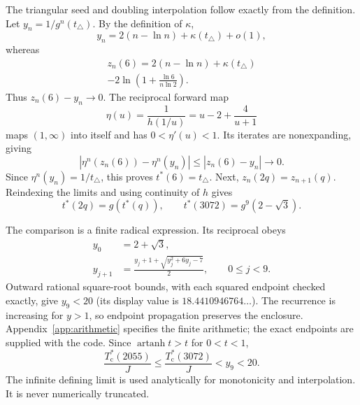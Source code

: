 \documentclass[aps,pre,reprint,amsmath,amssymb,nofootinbib,longbibliography,floatfix]{revtex4-2}
\newcommand{\Tc}{T_{\mathrm c}}
\newcommand{\atanh}{\operatorname{artanh}}
\begin{document}
The triangular seed and doubling interpolation follow exactly from the definition. Let \(y_n=1/g^n(t_\triangle)\). By the definition of \(\kappa\),
\begin{equation}
 y_n=2(n-\ln n)+\kappa(t_\triangle)+o(1),
\end{equation}
whereas
\begin{equation}
\begin{split}
 z_n(6)=2(n-\ln n)+\kappa(t_\triangle)\\
 -2\ln\!\left(1+\frac{\ln6}{n\ln2}\right).
\end{split}
\end{equation}
Thus \(z_n(6)-y_n\to0\). The reciprocal forward map
\begin{equation}
 \eta(u)=\frac1{h(1/u)}=u-2+\frac4{u+1}
\end{equation}
maps \((1,\infty)\) into itself and has \(0<\eta'(u)<1\). Its iterates are nonexpanding, giving
\begin{equation}
 \left|\eta^n(z_n(6))-\eta^n(y_n)\right|
 \leq |z_n(6)-y_n|\longrightarrow0.
\end{equation}
Since \(\eta^n(y_n)=1/t_\triangle\), this proves \(t^*(6)=t_\triangle\).
Next, \(z_n(2q)=z_{n+1}(q)\). Reindexing the limits and using continuity of \(h\) gives
\begin{equation}
 t^*(2q)=g(t^*(q)),\qquad
 t^*(3072)=g^9(2-\sqrt3).
 \label{eq:interpolation}
\end{equation}

The comparison is a finite radical expression. Its reciprocal obeys
\begin{equation}
\begin{aligned}
 y_0&=2+\sqrt3,\\
 y_{j+1}&=\frac{y_j+1+\sqrt{y_j^2+6y_j-7}}2,
 \qquad 0\leq j<9.
\end{aligned}
\label{eq:radicals}
\end{equation}
Outward rational square-root bounds, with each squared endpoint checked exactly, give \(y_9<20\) (its display value is \(18.4410946764\ldots\)). The recurrence is increasing for \(y>1\), so endpoint propagation preserves the enclosure. Appendix~\ref{app:arithmetic} specifies the finite arithmetic; the exact endpoints are supplied with the code. Since \(\atanh t>t\) for \(0<t<1\),
\begin{equation}
 \boxed{\frac{\Tc^*(2055)}J\leq
        \frac{\Tc^*(3072)}J<y_9<20.}
 \label{eq:upper}
\end{equation}
The infinite defining limit is used analytically for monotonicity and interpolation. It is never numerically truncated.
\end{document}
